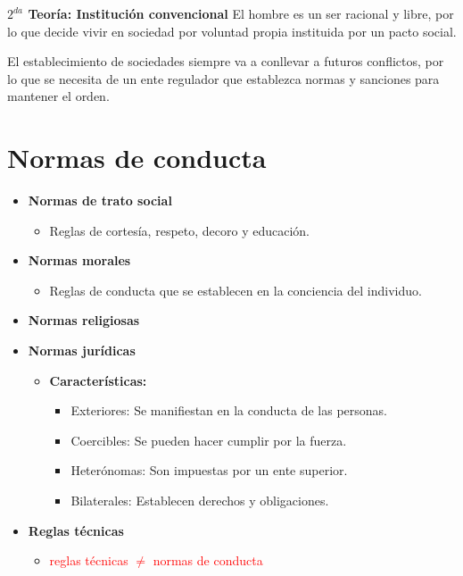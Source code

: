 \documentclass{templateNote}
\begin{document}
\noindent\textbf{$2^{da}$ Teoría: Institución convencional}
\noindent El hombre es un ser racional y libre, por lo que decide vivir en sociedad por voluntad propia instituida por un pacto social.


\begin{tcolorbox}
    El establecimiento de sociedades siempre va a conllevar a futuros conflictos, por lo que se necesita de un ente regulador que establezca normas y sanciones para mantener el orden.
\end{tcolorbox}

\section{Normas de conducta}
\begin{itemize}
    \item \textbf{Normas de trato social}
    \begin{itemize}
        \item Reglas de cortesía, respeto, decoro y educación.
    \end{itemize}
    
    \item \textbf{Normas morales}
    \begin{itemize}
        \item Reglas de conducta que se establecen en la conciencia del individuo.
    \end{itemize}
    
    \item \textbf{Normas religiosas}
    
    \item \textbf{Normas jurídicas}
    \begin{itemize}
        \item \textbf{Características:}
        \begin{itemize}
            \item Exteriores: Se manifiestan en la conducta de las personas.
            \item Coercibles: Se pueden hacer cumplir por la fuerza.
            \item Heterónomas: Son impuestas por un ente superior.
            \item Bilaterales: Establecen derechos y obligaciones.
        \end{itemize}
    \end{itemize}
    
    \item \textbf{Reglas técnicas}
    \begin{itemize}
        \item \textcolor{red}{reglas técnicas $\neq$ normas de conducta}
    \end{itemize}
\end{itemize}
\end{document}
